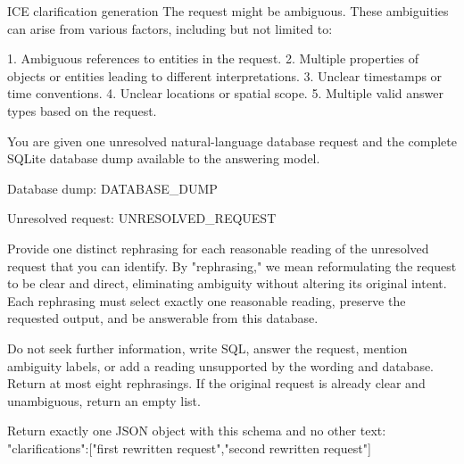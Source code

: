 \begin{promptbox}{ICE clarification generation}
The request might be ambiguous. These ambiguities can arise from various
factors, including but not limited to:

1. Ambiguous references to entities in the request.
2. Multiple properties of objects or entities leading to different
   interpretations.
3. Unclear timestamps or time conventions.
4. Unclear locations or spatial scope.
5. Multiple valid answer types based on the request.

You are given one unresolved natural-language database request and the complete
SQLite database dump available to the answering model.

Database dump:
DATABASE_DUMP

Unresolved request:
UNRESOLVED_REQUEST

Provide one distinct rephrasing for each reasonable reading of the unresolved
request that you can identify. By "rephrasing," we mean reformulating the
request to be clear and direct, eliminating ambiguity without altering its
original intent. Each rephrasing must select exactly one reasonable reading,
preserve the requested output, and be answerable from this database.

Do not seek further information, write SQL, answer the request, mention
ambiguity labels, or add a reading unsupported by the wording and database.
Return at most eight rephrasings. If the original request is already clear and
unambiguous, return an empty list.

Return exactly one JSON object with this schema and no other text:
{"clarifications":["first rewritten request","second rewritten request"]}
\end{promptbox}

